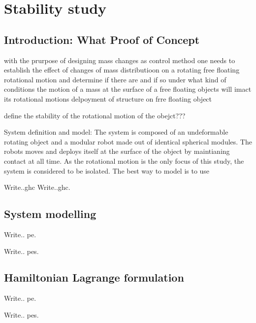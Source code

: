 

\chapter{Stability study}
\label{ch:Stability study}

\section{Introduction: What Proof of Concept}
\label{Introduction: What Proof of Concept}
with the prurpose of designing mass changes as control method one needs to establish the effect of changes of mass distributioon on a rotating free floating rotational motion and determine if there are and if so under what kind of conditions the motion of a mass at the surface of a free floating objects will imact its rotational motions
delpoyment of structure on frre floating object

define the stability of the rotational motion of the obejct???

System definition and model: The system is composed of an undeformable rotating object and a modular robot made out of identical spherical modules. The robots moves and deploys itself at the surface of the object by maintianing contact at all time. As the rotational motion is the only focus of this study, the system is considered to be isolated.
The best way to model is to use 

Write..\gls{ghc}
Write..\gls{ghc}.


\section{System modelling}
\label{System modelling}

Write.. \gls{pe}.

Write.. \glspl{pe}.

\section{Hamiltonian Lagrange formulation}
\label{Hamiltonian Lagrange formulation}

Write.. \gls{pe}.

Write.. \glspl{pe}.

